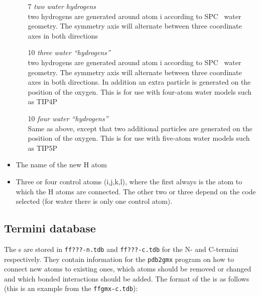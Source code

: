 \begin{itemize}
\begin{enumerate}
\item[7]{\em two water hydrogens}\\
two hydrogens are generated around atom i according to
SPC~\cite{Berendsen81} water geometry. The symmetry axis will
alternate between three coordinate axes in both directions

\item[10]{\em three water ``hydrogens''}\\
two hydrogens are generated around atom i according to
SPC~\cite{Berendsen81} water geometry. The symmetry axis will
alternate between three coordinate axes in both directions. In addition
an extra particle is generated on the position of the oxygen. This is for
use with four-atom water models such as TIP4P~\cite{Jorgensen83}

\item[10]{\em four water ``hydrogens''}\\
Same as above, except that two  additional
particles are generated on the position of the oxygen. This is for
use with five-atom water models such as TIP5P~\cite{Mahoney2000a}
\end{enumerate}

\item
The name of the new H atom

\item
Three or four control atoms (i,j,k,l), where the first always is the
atom to which the H atoms are connected. The other two or three depend
on the code selected (for water there is only one control atom).
\end{itemize}

\subsection{Termini database}
\label{subsec:tdb}
The s are stored in {\tt ff???-n.tdb} and
{\tt ff???-c.tdb} for the N- and C-termini respectively. They contain
information for the {\tt pdb2gmx} program on how to connect new atoms
to existing ones, which atoms should be removed or changed and which
bonded interactions should be added. The format of the is as follows
(this is an example from the {\tt ffgmx-c.tdb}):

